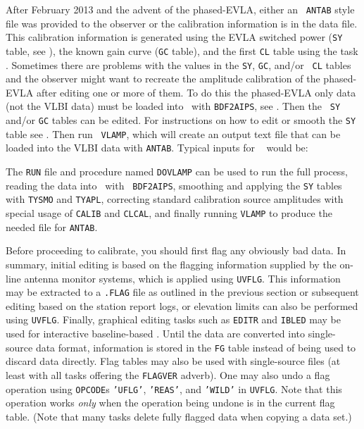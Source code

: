 After February 2013 and the advent of the phased-EVLA, either an {\tt
ANTAB} style file was provided to the observer or the calibration
information is in the data file.  This calibration information is
generated using the EVLA switched power ({\tt SY} table, see
), the known gain curve ({\tt GC} table), and the first
{\tt CL} table using the task {\tt {}}\@.  Sometimes there
are problems with the values in the {\tt SY}, {\tt GC}, and/or {\tt
CL} tables and the observer might want to recreate the amplitude
calibration of the phased-EVLA after editing one or more of them.  To
do this the phased-EVLA only data (not the VLBI data) must be loaded
into \AIPS\ with {\tt BDF2AIPS}, see .  Then the {\tt
SY} and/or {\tt GC} tables can be edited.  For instructions on how to
edit or smooth the {\tt SY} table see .  Then run {\tt
VLAMP}, which will create an output text file that can be loaded into
the VLBI data with {\tt ANTAB}\@.  Typical inputs for {\tt
{}} would be:

The {\tt RUN} file and procedure named {\tt DOVLAMP} can be used to
run the full process, reading the data into \AIPS\ with {\tt
BDF2AIPS}, smoothing and applying the {\tt SY} tables with {\tt TYSMO}
and {\tt TYAPL}, correcting standard calibration source amplitudes
with special usage of {\tt CALIB} and {\tt CLCAL}, and finally running
{\tt VLAMP} to produce the needed file for {\tt ANTAB}\@.


Before proceeding to calibrate, you should first flag any obviously
bad data.  In summary, initial editing is based on the flagging
information supplied by the on-line antenna monitor systems, which is
applied using {\tt UVFLG}\@.  This information may be extracted to a
{\tt .FLAG} file as outlined in the previous section or subsequent
editing based on the station report logs, or elevation limits can also
be performed using {\tt UVFLG}\@.  Finally, graphical editing tasks
such as {\tt EDITR} and {\tt IBLED} may be used for interactive
baseline-based .  Until the data are converted into
single-source data format,  information is stored in
the {\tt FG} table instead of being used to discard data directly.
Flag tables may also be used with single-source files (at least with
all tasks offering the {\tt FLAGVER} adverb).  One may also undo a
flag operation using {\tt OPCODE}s {\tt 'UFLG'}, {\tt 'REAS'}, and
{\tt 'WILD'} in {\tt UVFLG}\@.  Note that this operation works {\it
only} when the operation being undone is in the current flag table.
(Note that many tasks delete fully flagged data when copying a data
set.)

